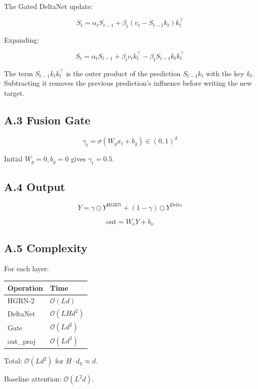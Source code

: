 The Gated DeltaNet update:

\[
S_t = \alpha_t S_{t-1} + \beta_t (v_t - S_{t-1} k_t) k_t^\top
\tag{A.3}
\]

Expanding:

\[
S_t = \alpha_t S_{t-1} + \beta_t v_t k_t^\top - \beta_t S_{t-1} k_t k_t^\top
\tag{A.4}
\]

The term $S_{t-1} k_t k_t^\top$ is the outer product of the prediction 
$S_{t-1} k_t$ with the key $k_t$. Subtracting it removes the previous 
prediction's influence before writing the new target.

\subsection{A.3 Fusion Gate}

\[
\gamma_t = \sigma(W_g x_t + b_g) \in (0, 1)^d
\tag{A.5}
\]

Initial $W_g = 0, b_g = 0$ gives $\gamma_t = 0.5$.

\subsection{A.4 Output}

\[
Y = \gamma \odot Y^\text{HGRN} + (1 - \gamma) \odot Y^\text{Delta}
\tag{A.6}
\]

\[
\text{out} = W_o Y + b_o
\tag{A.7}
\]

\subsection{A.5 Complexity}

For each layer:

\begin{table}[H]
\centering
\small
\begin{tabular}{ll}
\toprule
\textbf{Operation} & \textbf{Time} \\
\midrule
HGRN-2 & $\mathcal{O}(L d)$ \\
DeltaNet & $\mathcal{O}(L H d^2)$ \\
Gate & $\mathcal{O}(L d^2)$ \\
out\_proj & $\mathcal{O}(L d^2)$ \\
\bottomrule
\end{tabular}
\end{table}

Total: $\mathcal{O}(L d^2)$ for $H \cdot d_h \approx d$.

Baseline attention: $\mathcal{O}(L^2 d)$.


